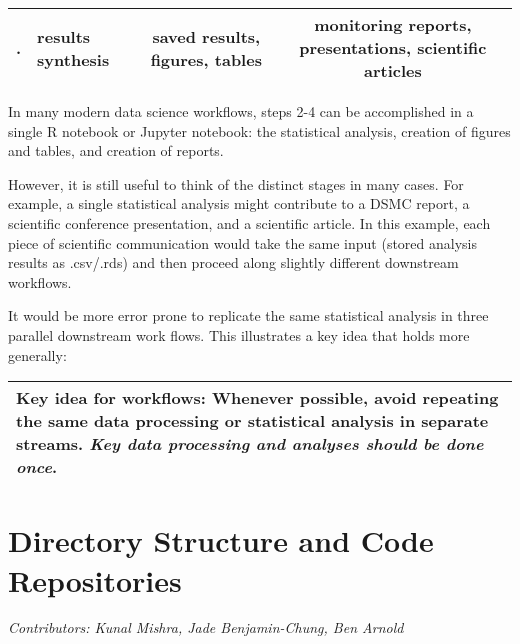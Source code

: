 \documentclass[]{book}
\begin{document}
\begin{longtable}[]{@{}clcc@{}}
\begin{minipage}[t]{0.07\columnwidth}
.\strut
\end{minipage} & \begin{minipage}[t]{0.25\columnwidth}\raggedright
results synthesis\strut
\end{minipage} & \begin{minipage}[t]{0.28\columnwidth}\centering
saved results, figures, tables\strut
\end{minipage} & \begin{minipage}[t]{0.29\columnwidth}\centering
monitoring reports, presentations, scientific articles\strut
\end{minipage}\tabularnewline
\bottomrule
\end{longtable}

In many modern data science workflows, steps 2-4 can be accomplished in a single R notebook or Jupyter notebook: the statistical analysis, creation of figures and tables, and creation of reports.

However, it is still useful to think of the distinct stages in many cases. For example, a single statistical analysis might contribute to a DSMC report, a scientific conference presentation, and a scientific article. In this example, each piece of scientific communication would take the same input (stored analysis results as .csv/.rds) and then proceed along slightly different downstream workflows.

It would be more error prone to replicate the same statistical analysis in three parallel downstream work flows. This illustrates a key idea that holds more generally:

\begin{longtable}[]{@{}l@{}}
\toprule
\endhead
\textbf{Key idea for workflows:} Whenever possible, avoid repeating the same data processing or statistical analysis in separate streams. \emph{Key data processing and analyses should be done once}.\tabularnewline
\bottomrule
\end{longtable}

\hypertarget{directory-structure-and-code-repositories}{%
\chapter{Directory Structure and Code Repositories}\label{directory-structure-and-code-repositories}}

\emph{Contributors: Kunal Mishra, Jade Benjamin-Chung, Ben Arnold}
\end{document}

